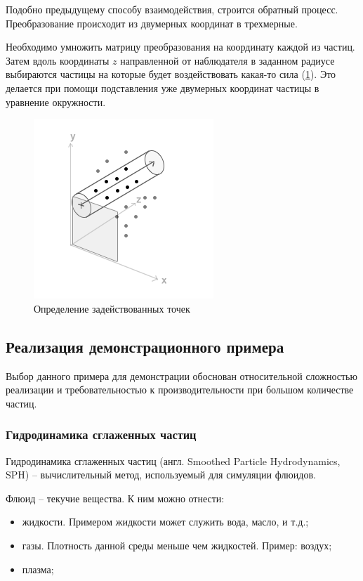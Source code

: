 Подобно предыдущему способу взаимодействия, строится обратный процесс. 
Преобразование происходит из двумерных координат в трехмерные.

Необходимо умножить матрицу преобразования на координату каждой из частиц. 
Затем вдоль координаты $z$ направленной от наблюдателя в заданном радиусе
выбираются частицы на которые будет воздействовать какая-то сила (\ref{fig:user_input}). 
Это делается при помощи подставления уже двумерных координат частицы в 
уравнение окружности.


\begin{figure}
\begin{center}
  \includegraphics[scale=1.0]{Figures/user_input}
\end{center}
\caption{Определение задействованных точек}
\label{fig:user_input}
\end{figure}

\subsection{Реализация демонстрационного примера}

Выбор данного примера для демонстрации обоснован относительной сложностью реализации
и требовательностью к производительности при большом количестве частиц.

\subsubsection{Гидродинамика сглаженных частиц}

Гидродинамика сглаженных частиц (англ. Smoothed Particle Hydrodynamics, SPH) -- вычислительный 
метод, используемый для симуляции флюидов.

Флюид -- текучие вещества. К ним можно отнести:
\begin{itemize}
  \item жидкости. Примером жидкости может служить вода, масло, и т.д.;
  \item газы. Плотность данной среды меньше чем жидкостей. Пример: воздух;
  \item плазма;
\end{itemize}

